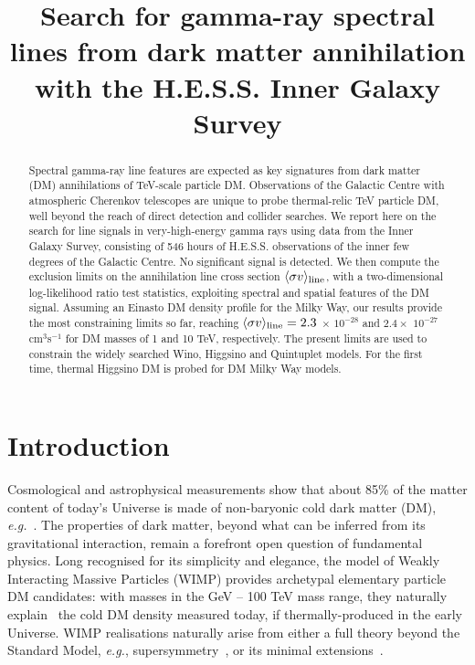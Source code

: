 \documentclass[aps,prl,twocolumn,floats,balancelastpage,showpacs,showkeys,preprintnumbers,floatfix,nofootinbib,superscriptaddress, longbibliography]{revtex4-1}
\begin{document}
\title{Search for gamma-ray spectral lines from dark matter annihilation with the H.E.S.S. Inner Galaxy Survey}



\begin{abstract}
Spectral gamma-ray line features are expected as key signatures from dark matter (DM) annihilations of TeV-scale particle DM. Observations of the Galactic Centre with atmospheric Cherenkov telescopes are unique to probe thermal-relic TeV particle DM, well beyond the reach of direct detection and collider searches. We report here on the search for line signals in very-high-energy gamma rays using data from the Inner Galaxy Survey, consisting of 546 hours of H.E.S.S. observations of the inner few degrees of the Galactic Centre. No significant signal is detected. We then compute the exclusion limits on the annihilation line cross section $\langle \sigma v \rangle_{\rm line}$, with a two-dimensional log-likelihood ratio test statistics, exploiting spectral and spatial features of the DM signal. Assuming an Einasto DM density profile for the Milky Way, our results provide the most constraining limits so far, reaching $\langle \sigma v \rangle_{\rm line} = 2.3$ $\times$ $10^{-28}$ and $2.4  \times$ $10^{-27}$ cm$^3$s$^{-1}$ for DM masses of 1 and 10 TeV, respectively. The present limits are used to constrain the widely searched Wino, Higgsino and Quintuplet models. For the first time, thermal Higgsino DM is probed for DM Milky Way models.
\end{abstract}


\maketitle


\section{Introduction}
\label{sec:introduction}

Cosmological and astrophysical measurements show that about 85\% of the matter content of today's Universe is made of non-baryonic cold dark matter (DM), \textit{e.g.}~\cite{Planck:2018vyg}. The properties of dark matter, beyond what can be inferred from its gravitational interaction, remain
a forefront open question of fundamental physics. Long recognised for its simplicity and elegance, the model of Weakly Interacting Massive Particles (WIMP) provides archetypal elementary particle DM candidates: with masses in the GeV -- 100 TeV mass range, they naturally explain~\cite{Bergstrom:2000pn} the cold DM density measured today, if thermally-produced in the early Universe. WIMP realisations naturally arise from either a full theory beyond the Standard Model, \textit{e.g.}, supersymmetry~\cite{Jungman:1995df}, or its minimal extensions~\cite{Cirelli:2005uq,Cirelli:2007xd,Cirelli:2008id,Cirelli:2009uv,Cirelli:2015bda,Mahbubani:2005pt,Kearney:2016rng}.
\end{document}
